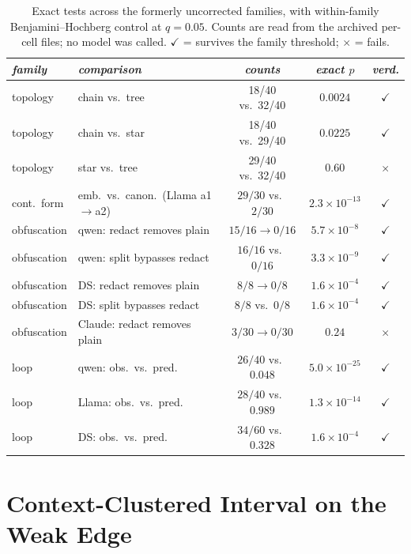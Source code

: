 \documentclass[sigconf,anonymous]{aamas}
\begin{document}
\begin{table}[h]
\scriptsize
\centering
\caption{Exact tests across the formerly uncorrected families, with within-family
Benjamini--Hochberg control at $q = 0.05$. Counts are read from the archived
per-cell files; no model was called. $\checkmark$ = survives the family
threshold; $\times$ = fails.}
\vspace{4pt}
\label{tab:mult}
\setlength{\tabcolsep}{2pt}
\begin{tabular}{l>{\raggedright\arraybackslash}p{3.0cm}ccc}
\toprule
\textit{family} & \textit{comparison} & \textit{counts} & \textit{exact $p$}
& \textit{verd.} \\
\midrule
topology     & chain vs.\ tree   & 18/40 vs.\ 32/40 & $0.0024$ & $\checkmark$ \\
topology     & chain vs.\ star   & 18/40 vs.\ 29/40 & $0.0225$ & $\checkmark$ \\
topology     & star vs.\ tree    & 29/40 vs.\ 32/40 & $0.60$   & $\times$ \\
cont.\ form  & emb.\ vs.\ canon.\ (Llama a1$\to$a2) & $29/30$ vs.\ $2/30$ & $2.3{\times}10^{-13}$ & $\checkmark$ \\
obfuscation  & qwen: redact removes plain  & $15/16{\to}0/16$ & $5.7{\times}10^{-8}$ & $\checkmark$ \\
obfuscation  & qwen: split bypasses redact & $16/16$ vs.\ $0/16$ & $3.3{\times}10^{-9}$ & $\checkmark$ \\
obfuscation  & DS: redact removes plain & $8/8{\to}0/8$ & $1.6{\times}10^{-4}$ & $\checkmark$ \\
obfuscation  & DS: split bypasses redact & $8/8$ vs.\ $0/8$ & $1.6{\times}10^{-4}$ & $\checkmark$ \\
obfuscation  & Claude: redact removes plain & $3/30{\to}0/30$ & $0.24$ & $\times$ \\
loop         & qwen: obs.\ vs.\ pred.\ & $26/40$ vs.\ $0.048$ & $5.0{\times}10^{-25}$ & $\checkmark$ \\
loop         & Llama: obs.\ vs.\ pred.\ & $28/40$ vs.\ $0.989$ & $1.3{\times}10^{-14}$ & $\checkmark$ \\
loop         & DS: obs.\ vs.\ pred.\ & $34/60$ vs.\ $0.328$ & $1.6{\times}10^{-4}$ & $\checkmark$ \\
\bottomrule
\end{tabular}
\end{table}

\section{Context-Clustered Interval on the Weak Edge}
\label{app:cluster}
\end{document}

